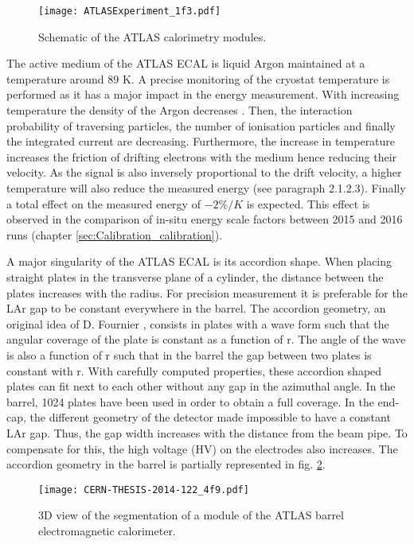 \begin{figure}[htbp]
\centering
\texttt{[image: ATLASExperiment\_1f3.pdf]}
\caption{\label{fig:orge5c6ca3}
Schematic of the ATLAS calorimetry modules.\cite{ATLASExperiment}}
\end{figure}

The active medium of the ATLAS ECAL is liquid Argon maintained at a temperature around 89 K.
A precise monitoring of the cryostat temperature is performed as it has a major impact in the energy measurement.
With increasing temperature the density of the Argon decreases \cite{VANITTERBEEK1960931}.
Then, the interaction probability of traversing particles, the number of ionisation particles and finally the integrated current are decreasing.
Furthermore, the increase in temperature increases the friction of drifting electrons with the medium hence reducing their velocity.
As the signal is also inversely proportional to the drift velocity, a higher temperature will also reduce the measured energy (see \cite{ATLAS-TDR-2} paragraph 2.1.2.3).
Finally a total effect on the measured energy of $-2\%/K$ is expected.
This effect is observed in the comparison of in-situ energy scale factors between 2015 and 2016 runs (chapter \ref{sec:Calibration_calibration}).

A major singularity of the ATLAS ECAL is its accordion shape.
When placing straight plates in the transverse plane of a cylinder, the distance between the plates increases with the radius.
For precision measurement it is preferable for the LAr gap to be constant everywhere in the barrel.
The accordion geometry, an original idea of D. Fournier \cite{fournier:in2p3-00020706},  consists in plates with a wave form such that the angular coverage of the plate is constant as a function of r.
The angle of the wave is also a function of r such that in the barrel the gap between two plates is constant with r.
With carefully computed properties, these accordion shaped plates can fit next to each other without any gap in the azimuthal angle.
In the barrel, 1024 plates have been used in order to obtain a full coverage.
In the end-cap, the different geometry of the detector made impossible to have a constant LAr gap.
Thus, the gap width increases with the distance from the beam pipe.
To compensate for this, the high voltage (HV) on the electrodes also increases.
The accordion geometry in the barrel is partially represented in fig. \ref{fig:org246373c}.

\begin{figure}[htbp]
\centering
\texttt{[image: CERN-THESIS-2014-122\_4f9.pdf]}
\caption{\label{fig:org246373c}
3D view of the segmentation of a module of the ATLAS barrel electromagnetic calorimeter.\cite{CERN-THESIS-2014-122}}
\end{figure}

